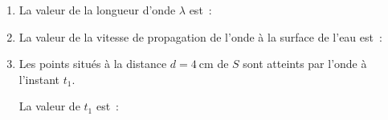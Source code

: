 \begin{enumerate}
          \vspace{-2cm}
          \begin{enumerate}
              \item La valeur de la longueur d'onde $\lambda$ est~:
          
              \item La valeur de la vitesse de propagation de l'onde à la
                    surface de l'eau est~: \par
          
              \item Les points situés à la distance $d=\qty{4}{\cm}$ de $S$
                    sont atteints par l'onde à l'instant $t_{1}$.
          
                    La valeur de $t_{1}$ est~: \par
          \end{enumerate}



\end{enumerate}
